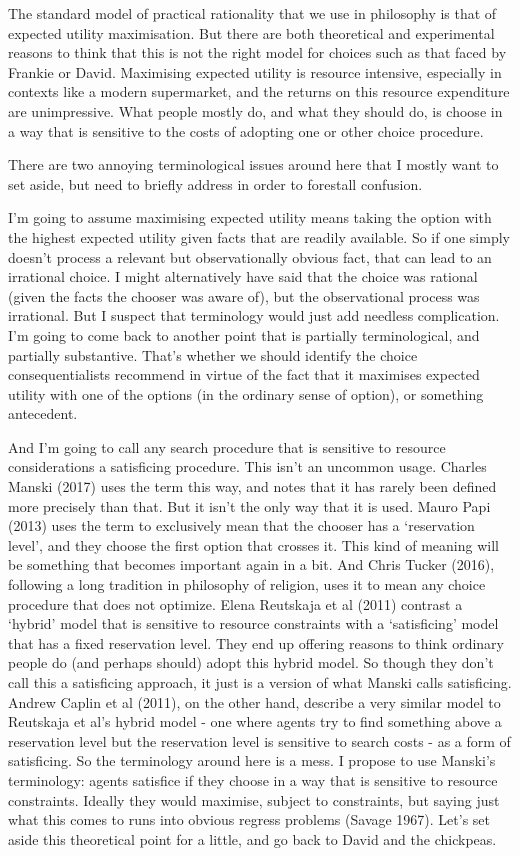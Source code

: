 \documentclass[
  12pt,
]{article}
\begin{document}
The standard model of practical rationality that we use in philosophy is that of expected utility maximisation. But there are both theoretical and experimental reasons to think that this is not the right model for choices such as that faced by Frankie or David. Maximising expected utility is resource intensive, especially in contexts like a modern supermarket, and the returns on this resource expenditure are unimpressive. What people mostly do, and what they should do, is choose in a way that is sensitive to the costs of adopting one or other choice procedure.

There are two annoying terminological issues around here that I mostly want to set aside, but need to briefly address in order to forestall confusion.

I'm going to assume maximising expected utility means taking the option with the highest expected utility given facts that are readily available. So if one simply doesn't process a relevant but observationally obvious fact, that can lead to an irrational choice. I might alternatively have said that the choice was rational (given the facts the chooser was aware of), but the observational process was irrational. But I suspect that terminology would just add needless complication. I'm going to come back to another point that is partially terminological, and partially substantive. That's whether we should identify the choice consequentialists recommend in virtue of the fact that it maximises expected utility with one of the options (in the ordinary sense of option), or something antecedent.

And I'm going to call any search procedure that is sensitive to resource considerations a satisficing procedure. This isn't an uncommon usage. Charles Manski (2017) uses the term this way, and notes that it has rarely been defined more precisely than that. But it isn't the only way that it is used. Mauro Papi (2013) uses the term to exclusively mean that the chooser has a `reservation level', and they choose the first option that crosses it. This kind of meaning will be something that becomes important again in a bit. And Chris Tucker (2016), following a long tradition in philosophy of religion, uses it to mean any choice procedure that does not optimize. Elena Reutskaja et al (2011) contrast a `hybrid' model that is sensitive to resource constraints with a `satisficing' model that has a fixed reservation level. They end up offering reasons to think ordinary people do (and perhaps should) adopt this hybrid model. So though they don't call this a satisficing approach, it just is a version of what Manski calls satisficing. Andrew Caplin et al (2011), on the other hand, describe a very similar model to Reutskaja et al's hybrid model - one where agents try to find something above a reservation level but the reservation level is sensitive to search costs - as a form of satisficing. So the terminology around here is a mess. I propose to use Manski's terminology: agents satisfice if they choose in a way that is sensitive to resource constraints. Ideally they would maximise, subject to constraints, but saying just what this comes to runs into obvious regress problems (Savage 1967). Let's set aside this theoretical point for a little, and go back to David and the chickpeas.
\end{document}
